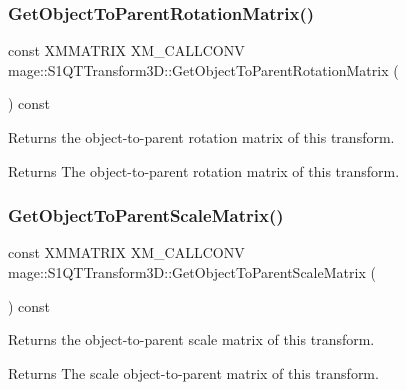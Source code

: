 \subsubsection{\texorpdfstring{Get\+Object\+To\+Parent\+Rotation\+Matrix()}{GetObjectToParentRotationMatrix()}}
{\footnotesize\ttfamily const X\+M\+M\+A\+T\+R\+IX X\+M\+\_\+\+C\+A\+L\+L\+C\+O\+NV mage\+::\+S1\+Q\+T\+Transform3\+D\+::\+Get\+Object\+To\+Parent\+Rotation\+Matrix (\begin{DoxyParamCaption}{ }\end{DoxyParamCaption}) const\hspace{0.3cm}{\ttfamily [noexcept]}}

Returns the object-\/to-\/parent rotation matrix of this transform.

\begin{DoxyReturn}{Returns}
The object-\/to-\/parent rotation matrix of this transform. 
\end{DoxyReturn}
\mbox{\label{classmage_1_1_s1_q_t_transform3_d_a1d77c2e2bfc8649f4f150bd7f03844bd}} 
\subsubsection{\texorpdfstring{Get\+Object\+To\+Parent\+Scale\+Matrix()}{GetObjectToParentScaleMatrix()}}
{\footnotesize\ttfamily const X\+M\+M\+A\+T\+R\+IX X\+M\+\_\+\+C\+A\+L\+L\+C\+O\+NV mage\+::\+S1\+Q\+T\+Transform3\+D\+::\+Get\+Object\+To\+Parent\+Scale\+Matrix (\begin{DoxyParamCaption}{ }\end{DoxyParamCaption}) const\hspace{0.3cm}{\ttfamily [noexcept]}}

Returns the object-\/to-\/parent scale matrix of this transform.

\begin{DoxyReturn}{Returns}
The scale object-\/to-\/parent matrix of this transform. 
\end{DoxyReturn}
\mbox{\label{classmage_1_1_s1_q_t_transform3_d_a7904c17bbf67be7e82768594b229e257}} 
